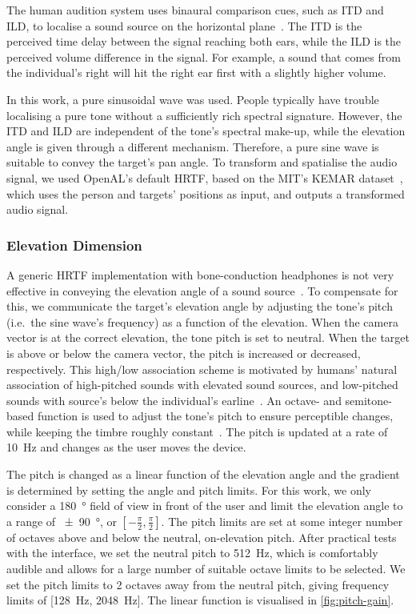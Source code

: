 \documentclass{article}
\begin{document}
The human audition system uses binaural comparison cues, such as ITD and ILD, to localise a sound source on the horizontal plane~\cite{blauert1969sound}.
The ITD is the perceived time delay between the signal reaching both ears, while the ILD is the perceived volume difference in the signal.
For example, a sound that comes from the individual's right will hit the right ear first with a slightly higher volume.

In this work, a pure sinusoidal wave was used. 
People typically have trouble localising a pure tone without a sufficiently rich spectral signature.
However, the ITD and ILD are independent of the tone's spectral make-up, while the elevation angle is given through a different mechanism. Therefore, a pure sine wave is suitable to convey the target's pan angle.
To transform and spatialise the audio signal, we used OpenAL's default HRTF, based on the MIT's KEMAR dataset~\cite{hiebert2005openal}, which uses the person and targets' positions as input, and outputs a transformed audio signal.

\subsubsection{Elevation Dimension}

A generic HRTF implementation with bone-conduction headphones is not very effective in conveying the elevation angle of a sound source~\cite{macdonald2006spatial,schonstein2008comparison}.
To compensate for this, we communicate the target's elevation angle by adjusting the tone's pitch (i.e.\ the sine wave's frequency) as a function of the elevation. 
When the camera vector is at the correct elevation, the tone pitch is set to neutral.
When the target is above or below the camera vector, the pitch is increased or decreased, respectively.
This high/low association scheme is motivated by humans' natural association of high-pitched sounds with elevated sound sources, and low-pitched sounds with source's below the individual's earline~\cite{pratt1930spatial,blauert1997spatial}.
An octave- and semitone-based function is used to adjust the tone's pitch to ensure perceptible changes, while keeping the timbre roughly constant~\cite{shepard1964circularity}.
The pitch is updated at a rate of \SI{10}{\hertz} and changes as the user moves the device.

The pitch is changed as a linear function of the elevation angle and the gradient is determined by setting the angle and pitch limits.
For this work, we only consider a \SI{180}{\degree} field of view in front of the user and limit the elevation angle to a range of \SI{\pm90}{\degree}, or $[-\frac{\pi}{2}, \frac{\pi}{2}]$.
The pitch limits are set at some integer number of octaves above and below the neutral, on-elevation pitch.
After practical tests with the interface, we set the neutral pitch to \SI{512}{\hertz}, which is comfortably audible and allows for a large number of suitable octave limits to be selected.
We set the pitch limits to 2 octaves away from the neutral pitch, giving frequency limits of [\SI{128}{\hertz}, \SI{2048}{\hertz}].
The linear function is visualised in \cref{fig:pitch-gain}.
\end{document}
